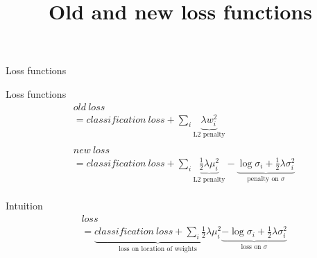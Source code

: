 \documentclass{beamer}
\newcommand{\undermath}[2]{\underbrace{#1}_\text{#2}}
\begin{document}
\begin{frame}{Loss functions}
	\title{Old and new loss functions}
	\begin{block}{Loss functions}
		\begin{align*}
			  & old \ loss                                                                                                                                                                    \\
			  & = classification \ loss +   \sum_i  \undermath{\lambda  w_i^2}{L2 penalty}                                                                                                    \\
			  &                                                                                                                                                                               \\
			  & new \ loss                                                                                                                                                                    \\		
			  & = classification \ loss +    \sum_i         \undermath{\frac{1}{2}\lambda\mu_i^2 }{L2 penalty}- \undermath{\log\sigma_i + \frac{1}{2}\lambda \sigma_i^2}{penalty on $\sigma$} \\
		\end{align*}
	\end{block}
		
%				
\end{frame}


\begin{frame}{Intuition}
	\begin{align*}
		  & loss                                                                                                                                                                             \\
		  & = \undermath{classification \ loss + \sum_i \frac{1}{2}\lambda\mu_i^2 }{loss on location of weights} \undermath{-\log\sigma_i + \frac{1}{2}\lambda \sigma_i^2}{loss on $\sigma$} 
	\end{align*}
\end{frame}
\end{document}
